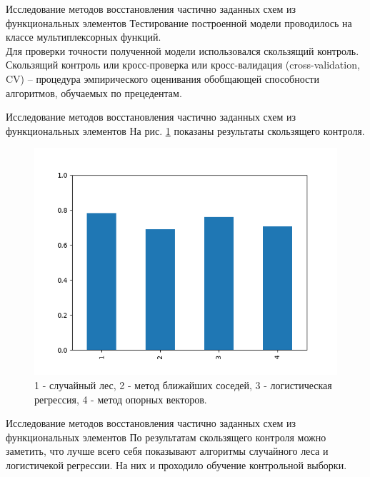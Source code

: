 \documentclass[serif,utf8]{beamer}
\begin{document}
\begin{frame}{Исследование методов восстановления частично заданных схем из функциональных элементов}
Тестирование построенной модели проводилось на классе мультиплексорных функций.\\
Для проверки точности полученной модели использовался скользящий контроль.\\
Скользящий контроль или кросс-проверка или кросс-валидация (cross-validation, CV) -- процедура эмпирического оценивания обобщающей способности алгоритмов, обучаемых по прецедентам.
\end{frame}

\begin{frame}{Исследование методов восстановления частично заданных схем из функциональных элементов}
На рис. \ref{picCV} показаны результаты скользящего контроля.\par
\begin{figure}[h!]
   \centering
   \includegraphics[width=0.5\linewidth]{cross_validation.png}
   \caption{\scriptsize{1 - случайный лес, 2 - метод ближайших соседей, 3 - логистическая регрессия, 4 - метод опорных векторов.}}
   \label{picCV}
\end{figure}
\end{frame}

\begin{frame}{Исследование методов восстановления частично заданных схем из функциональных элементов}
По результатам скользящего контроля можно заметить, что лучше всего себя показывают алгоритмы случайного леса и логистичекой регрессии. На них и проходило обучение контрольной выборки.
\end{frame}
\end{document}
